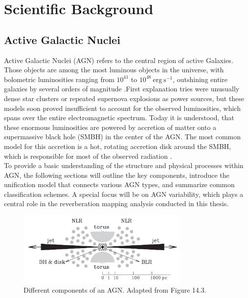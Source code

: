 \chapter{Scientific Background}
\label{chap:scientific_background}

\section{Active Galactic Nuclei}
\label{sec:agn}

Active Galactic Nuclei (AGN) refers to the central region of active Galaxies. Those objects are among the most luminous objects in the universe, with bolometric luminosities ranging from $10^{41}$ to $10^{48} \ \mathrm{erg \ s^{-1}}$, outshining entire galaxies by several orders of magnitude \parencite{peterson1997introduction}.First explanation tries were unusually dense star clusters or repeated supernova explosions as power sources, but these models soon proved insufficient to account for the observed luminosities, which spans over the entire electromagnetic spectrum. Today it is understood, that these enormous luminosities are powered by accretion of matter onto a supermassive black hole (SMBH) in the center of the AGN. The most common model for this accretion is a hot, rotating accretion disk around the SMBH, which is responsible for most of the observed radiation \parencite{shakura1973black}.\\
To provide a basic understanding of the structure and physical processes within AGN, the following sections will outline the key components, introduce the unification model that connects various AGN types, and summarize common classification schemes. A special focus will be on AGN variability, which plays a central role in the reverberation mapping analysis conducted in this thesis.



\begin{figure}[!ht]
	\centering
	\includegraphics[width=0.75\textwidth]{pictures/Chapter2/AGN_standard_paradigm.png}
	\caption{Different components of an AGN. Adapted from \parencite{mo2010galaxy} Figure 14.3.}
	\label{fig:agn_structure_mo}
\end{figure}


